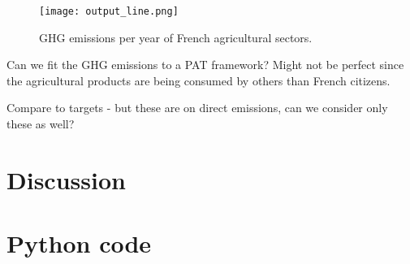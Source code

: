 \documentclass[a4paper,twoside]{article}
\begin{document}
\begin{figure}[H]
\centering
\texttt{[image: output\_line.png]}
\caption{GHG emissions per year of French agricultural sectors.}\label{fig:GHG} 
\end{figure}

Can we fit the GHG emissions to a PAT framework? Might not be perfect since the agricultural products are being consumed by others than French citizens.

Compare to targets - but these are on direct emissions, can we consider only these as well?

\section{Discussion}



\appendix

\section{Python code}
\end{document}
